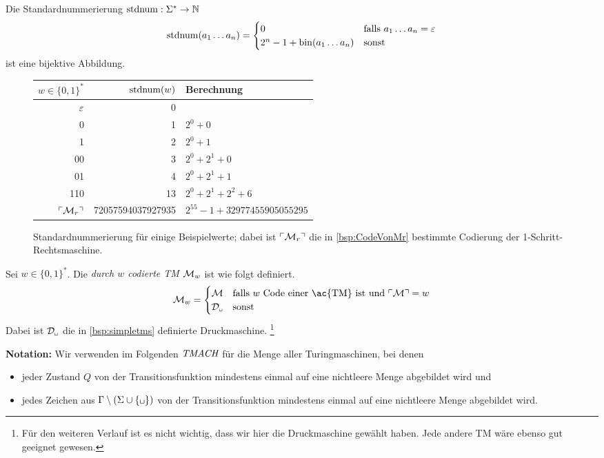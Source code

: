 \begin{lemma}\label{satz:stdnum}
Die Standardnummerierung $\operatorname{stdnum}: \Sigma^*\rightarrow\mathbb{N}$ 
 $$ \operatorname{stdnum}(a_1\dots a_n)=\begin{cases}
0 & \text{falls } a_1\dots a_n=\varepsilon\\
2^{n}-1+\operatorname{bin}(a_1\dots a_n) & \text{sonst}
\end{cases}$$
ist eine bijektive Abbildung.
\end{lemma}


 \begin{figure}[H]\centering
    \begin{tabular}{rr@{\qquad}l}
    $w\in\{0,1\}^*$ & $\operatorname{stdnum}(w)$ & Berechnung\\ \hline
    $\varepsilon$ & 0 \\
    0 & 1 & $2^0 + 0$\\
    1 & 2 & $2^0 + 1$\\
    00 & 3 & $2^0 + 2^1 + 0$\\
    01 & 4 & $2^0 + 2^1 + 1$\\
    110 & 13 & $2^0 + 2^1 + 2^2 + 6$\\
    $\ulcorner \mathcal{M}_r \urcorner$ & 72057594037927935 & $2^{55} - 1 + 32977455905055295$
    \end{tabular}

	\caption{Standardnummerierung für einige Beispielwerte; dabei ist $\ulcorner \mathcal{M}_r \urcorner$
	die in \autoref{bsp:CodeVonMr} bestimmte Codierung der 1-Schritt-Rechtsmaschine.}
\end{figure}


\begin{Def}
 Sei $w\in\{0,1\}^*$.
 Die \emph{durch $w$ codierte \ac{TM}} $\mathcal{M}_w$ ist wie folgt definiert.
 $$\M_w=\begin{cases}
\M & \text{falls } w \text{ Code einer \ac{TM} ist und } \godel{\M}=w\\
\D_\mblank & \text{sonst}
\end{cases}$$
Dabei ist $\D_\mblank$ die in \autoref{bsp:simpletms} definierte Druckmaschine.%
\footnote{Für den weiteren Verlauf ist es nicht wichtig, dass wir hier die Druckmaschine gewählt haben. Jede andere \ac{TM} wäre ebenso gut geeignet gewesen.}
\end{Def}

\textbf{Notation:}
Wir verwenden im Folgenden $\textit{TMACH}$ für die Menge aller Turingmaschinen, bei denen 
\begin{itemize}
 \item jeder Zustand $Q$ von der Transitionsfunktion mindestens einmal auf eine nichtleere Menge abgebildet wird und
 \item jedes Zeichen aus $\Gamma\setminus(\Sigma\cup\{\mblank\})$ von der Transitionsfunktion mindestens einmal auf eine nichtleere Menge abgebildet wird.
\end{itemize}


